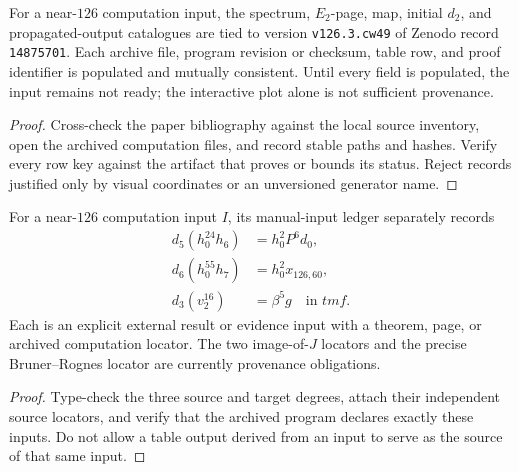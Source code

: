 \begin{proposition}
  \label{prop:lin-computation-provenance}
  \notready
  For a near-$126$ computation input, the spectrum, $E_2$-page, map, initial
  $d_2$, and propagated-output catalogues are tied to version
  \texttt{v126.3.cw49} of Zenodo record \texttt{14875701}.  Each archive file,
  program revision or checksum, table row, and proof identifier is populated
  and mutually consistent.  Until every field is populated, the input remains
  not ready; the interactive plot alone is not sufficient provenance.
\end{proposition}

\begin{proof}
  Cross-check the paper bibliography against the local source inventory, open
  the archived computation files, and record stable paths and hashes.  Verify
  every row key against the artifact that proves or bounds its status.  Reject
  records justified only by visual coordinates or an unversioned generator
  name.
\end{proof}

\begin{proposition}
  \label{prop:appendix-manual-inputs}
  \notready
  For a near-$126$ computation input $I$, its manual-input ledger separately
  records
  \[
  \begin{aligned}
    d_5(h_0^{24}h_6)&=h_0^2P^6d_0,\\
    d_6(h_0^{55}h_7)&=h_0^2x_{126,60},\\
    d_3(v_2^{16})&=\beta^5g\quad\text{in }tmf.
  \end{aligned}
  \]
  Each is an explicit external result or evidence input with a theorem, page,
  or archived computation locator.  The two image-of-$J$ locators and the
  precise Bruner--Rognes locator are currently provenance obligations.
\end{proposition}

\begin{proof}
  Type-check the three source and target degrees, attach their independent
  source locators, and verify that the archived program declares exactly these
  inputs.  Do not allow a table output derived from an input to serve as the
  source of that same input.
\end{proof}


